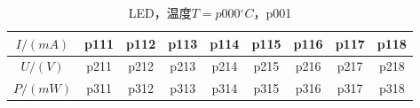 \newpage
\begin{table}[H]
    \centering
    \begin{tabular}{|c|c|c|c|c|c|c|c|c|}
        \hline
        $I/(\si{mA})$   & p111 & p112 & p113 & p114 & p115 & p116 & p117 & p118 \\\hline
        $U / (\si{V})$  & p211 & p212 & p213 & p214 & p215 & p216 & p217 & p218 \\\hline
        $P / (\si{mW})$ & p311 & p312 & p313 & p314 & p315 & p316 & p317 & p318 \\\hline
    \end{tabular}
    \caption{LED，温度$T=p000{}^{\circ}C$，p001}
\end{table}
